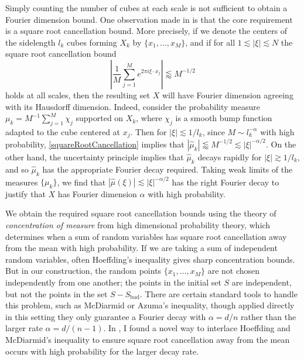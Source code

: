 \documentclass[11pt]{article}
\begin{document}
Simply counting the number of cubes at each scale is not sufficient to obtain a Fourier dimension bound. One observation made in \cite{DensonFourier} is that the core requirement is a square root cancellation bound. More precisely, if we denote the centers of the sidelength $l_k$ cubes forming $X_k$ by $\{ x_1,\dots,x_M \}$, and if for all $1 \lesssim |\xi| \lesssim N$ the square root cancellation bound
%
\begin{equation} \label{squareRootCancellation}
	\left| \frac{1}{M} \sum_{j = 1}^M e^{2 \pi i \xi \cdot x_j} \right| \lessapprox M^{-1/2}
\end{equation}
%
holds at all scales, then the resulting set $X$ will have Fourier dimension agreeing with its Hausdorff dimension. Indeed, consider the probability measure $\mu_k = M^{-1} \sum_{j = 1}^M \chi_j$ supported on $X_k$, where $\chi_j$ is a smooth bump function adapted to the cube centered at $x_j$. Then for $|\xi| \lesssim 1/l_k$, since $M \sim l_k^{-\alpha}$ with high probability, \eqref{squareRootCancellation} implies that $|\widehat{\mu}_k| \lessapprox M^{-1/2} \lesssim |\xi|^{-\alpha/2}$. On the other hand, the uncertainty principle implies that $\widehat{\mu}_k$ decays rapidly for $|\xi| \gtrsim 1/l_k$, and so $\widehat{\mu}_k$ has the appropriate Fourier decay required. Taking weak limits of the measures $\{ \mu_k \}$, we find that $|\widehat{\mu}(\xi)| \lesssim |\xi|^{-\alpha/2}$ has the right Fourier decay to justify that $X$ has Fourier dimension $\alpha$ with high probability.

We obtain the required square root cancellation bounds using the theory of \emph{concentration of measure} from high dimensional probability theory, which determines when a sum of random variables has square root cancellation away from the mean with high probability. If we are taking a sum of independent random variables, often Hoeffding's inequality gives sharp concentration bounds. But in our construction, the random points $\{ x_1, \dots, x_M \}$ are not chosen independently from one another; the points in the initial set $S$ are independent, but not the points in the set $S - S_{\text{bad}}$. There are certain standard tools to handle this problem, such as McDiarmid or Azuma's inequality, though applied directly in this setting they only guarantee a Fourier decay with $\alpha = d/n$ rather than the larger rate $\alpha = d/(n-1)$. In \cite{DensonFourier}, I found a novel way to interlace Hoeffding and McDiarmid's inequality to ensure square root cancellation away from the mean occurs with high probability for the larger decay rate.
\end{document}
